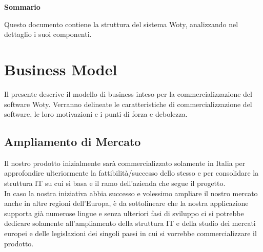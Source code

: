 
\newpage

\vspace*{0.5cm} %
\begin{center}

\textbf{{\huge{Sommario}}}

Questo documento contiene la struttura del sistema Woty, analizzando nel dettaglio i suoi componenti.

\vspace*{0.2cm} %

\end{center}






\newpage

\tableofcontents %

\let\cleardoublepage\clearpage %

\listoftables

\listoffigures




\newpage
\chapter{Business Model}

Il presente descrive il modello di business inteso per la commercializzazione del software Woty. Verranno delineate le caratteristiche di commercializzazione del software, le loro motivazioni e i punti di forza e debolezza.

\section{Ampliamento di Mercato}
Il nostro prodotto inizialmente sarà commercializzato solamente in Italia per approfondire ulteriormente la fattibilità/successo dello stesso e per consolidare la struttura IT su cui si basa e il ramo dell'azienda che segue il progetto.\\
In caso la nostra iniziativa abbia successo e volessimo ampliare il nostro mercato anche in altre regioni
dell'Europa, è da sottolineare che la nostra applicazione supporta già numerose lingue e senza ulteriori fasi
di sviluppo ci si potrebbe dedicare solamente all'ampliamento della struttura IT e della studio dei mercati
europei e delle legislazioni dei singoli paesi in cui si vorrebbe commercializzare il prodotto.

